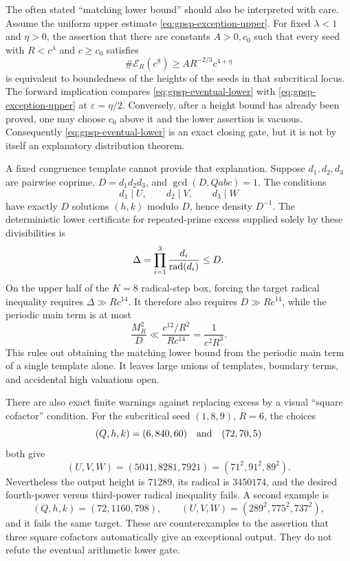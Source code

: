 The often stated ``matching lower bound'' should also be interpreted with
care.  Assume the uniform upper estimate \eqref{eq:gpsp-exception-upper}.
For fixed $\lambda<1$ and $\eta>0$, the assertion that there are constants
$A>0,c_0$ such that every seed with $R<c^\lambda$ and $c\geq c_0$ satisfies
\begin{equation}\label{eq:gpsp-eventual-lower}
 \#\mathcal E_R(c^8)\geq A R^{-2/3}c^{4+\eta}
\end{equation}
is equivalent to boundedness of the heights of the seeds in that
subcritical locus.  The forward implication compares
\eqref{eq:gpsp-eventual-lower} with \eqref{eq:gpsp-exception-upper} at
$\varepsilon=\eta/2$.  Conversely, after a height bound has already been
proved, one may choose $c_0$ above it and the lower assertion is vacuous.
Consequently \eqref{eq:gpsp-eventual-lower} is an exact closing gate, but it
is not by itself an explanatory distribution theorem.

A fixed congruence template cannot provide that explanation.  Suppose
$d_1,d_2,d_3$ are pairwise coprime, $D=d_1d_2d_3$, and
$\gcd(D,Qabc)=1$.  The conditions
\[
                   d_1\mid U,\qquad d_2\mid V,
                   \qquad d_3\mid W
\]
have exactly $D$ solutions $(h,k)$ modulo $D$, hence density $D^{-1}$.
The deterministic lower certificate for repeated-prime excess supplied
solely by these divisibilities is
\begin{equation}\label{eq:gpsp-crt-excess}
             \Delta=\prod_{i=1}^3\frac{d_i}{\operatorname{rad}(d_i)}\leq D.
\end{equation}
On the upper half of the $K=8$ radical-step box, forcing the target radical
inequality requires $\Delta\gg Rc^{14}$.  It therefore also requires
$D\gg Rc^{14}$, while the periodic main term is at most
\[
       \frac{M_R^2}{D}\ll \frac{c^{12}/R^2}{Rc^{14}}
        =\frac1{c^2R^3}.
\]
This rules out obtaining the matching lower bound from the periodic main term
of a single template alone.  It leaves
large unions of templates, boundary terms, and accidental high valuations
open.

There are also exact finite warnings against replacing excess by a visual
``square cofactor'' condition.  For the subcritical seed $(1,8,9)$, $R=6$,
the choices
\[
 (Q,h,k)=(6,840,60)\quad\hbox{and}\quad(72,70,5)
\]
both give
\[
 (U,V,W)=(5041,8281,7921)=(71^2,91^2,89^2).
\]
Nevertheless the output height is $71289$, its radical is $3450174$, and
the desired fourth-power versus third-power radical inequality fails.  A
second example is
\[
 (Q,h,k)=(72,1160,798),\qquad
 (U,V,W)=(289^2,775^2,737^2),
\]
and it fails the same target.  These are counterexamples to the assertion
that three square cofactors automatically give an exceptional output.  They
do not refute the eventual arithmetic lower gate.

